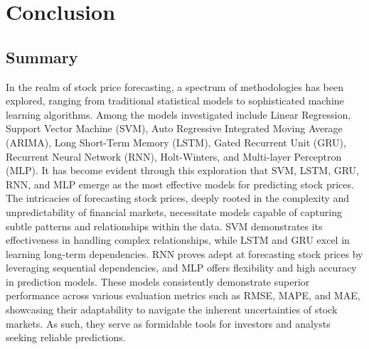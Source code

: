 \documentclass{ieeeojies}
\begin{document}
	\section{Conclusion}
	\subsection{Summary} 
	
	In the realm of stock price forecasting, a spectrum of methodologies has been explored, ranging from traditional statistical models to sophisticated machine learning algorithms. Among the models investigated include Linear Regression, Support Vector Machine (SVM), Auto Regressive Integrated Moving Average (ARIMA), Long Short-Term Memory (LSTM), Gated Recurrent Unit (GRU), Recurrent Neural Network (RNN), Holt-Winters, and Multi-layer Perceptron (MLP). It has become evident through this exploration that SVM, LSTM, GRU, RNN, and MLP emerge as the most effective models for predicting stock prices. \\
	The intricacies of forecasting stock prices, deeply rooted in the complexity and unpredictability of financial markets, necessitate models capable of capturing subtle patterns and relationships within the data. SVM demonstrates its effectiveness in handling complex relationships, while LSTM and GRU excel in learning long-term dependencies. RNN proves adept at forecasting stock prices by leveraging sequential dependencies, and MLP offers flexibility and high accuracy in prediction models. These models consistently demonstrate superior performance across various evaluation metrics such as RMSE, MAPE, and MAE, showcasing their adaptability to navigate the inherent uncertainties of stock markets. As such, they serve as formidable tools for investors and analysts seeking reliable predictions. 
\end{document}
